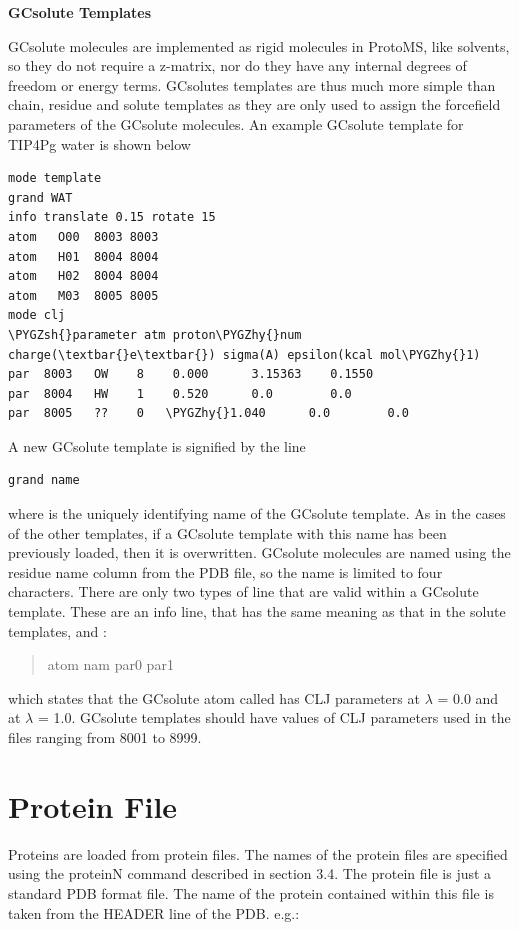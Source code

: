 \documentclass[letterpaper,10pt,english]{sphinxmanual}
\def\PYGZsh{\char`\#}
\def\PYGZhy{\char`\-}
\begin{document}
\textbf{GCsolute Templates}

GCsolute molecules are implemented as rigid molecules in ProtoMS, like solvents, so they do not require a z-matrix, nor do they have any internal degrees of freedom or energy terms. GCsolutes templates are thus much more simple than chain, residue and solute templates as they are only used to assign the forcefield parameters of the GCsolute molecules. An example GCsolute template for TIP4Pg water is shown below

\begin{Verbatim}[commandchars=\\\{\}]
mode template
grand WAT
info translate 0.15 rotate 15
atom   O00  8003 8003
atom   H01  8004 8004
atom   H02  8004 8004
atom   M03  8005 8005
mode clj
\PYGZsh{}parameter atm proton\PYGZhy{}num charge(\textbar{}e\textbar{}) sigma(A) epsilon(kcal mol\PYGZhy{}1)
par  8003   OW    8    0.000      3.15363    0.1550
par  8004   HW    1    0.520      0.0        0.0
par  8005   ??    0   \PYGZhy{}1.040      0.0        0.0
\end{Verbatim}

A new GCsolute template is signified by the line

\begin{Verbatim}[commandchars=\\\{\}]
grand name
\end{Verbatim}

where  is the uniquely identifying name of the GCsolute template. As in the cases of the other templates, if a GCsolute template with this name has been previously loaded, then it is overwritten. GCsolute molecules are named using the residue name column from the PDB file, so the name is limited to four characters. There are only two types of line that are valid within a GCsolute template. These are an info line, that has the same meaning as that in the solute templates, and :
\begin{quote}

atom nam par0 par1
\end{quote}

which states that the GCsolute atom called  has CLJ parameters  at \(\lambda\)  = 0.0 and  at \(\lambda\) = 1.0. GCsolute templates should have values of CLJ parameters used in the files ranging from 8001 to 8999.


\section{Protein File}
\label{protoms:protein-file}
Proteins are loaded from protein files. The names of the protein files are specified using the proteinN command described in section 3.4. The protein file is just a standard PDB format file. The name of the protein contained within this file is taken from the HEADER line of the PDB. e.g.:
\end{document}
